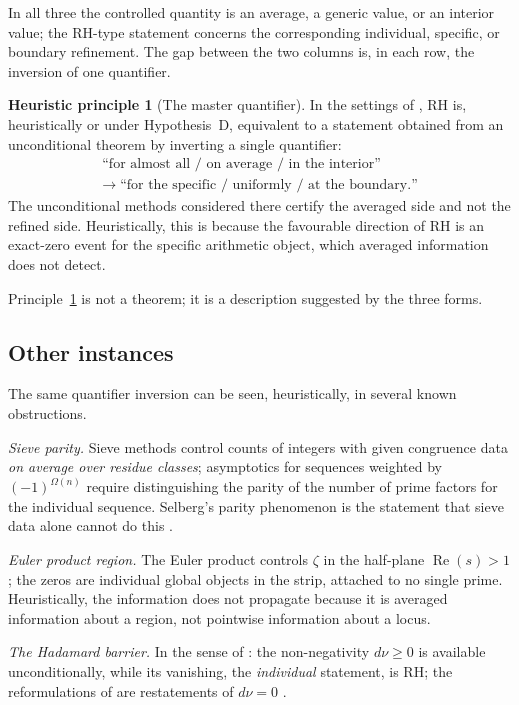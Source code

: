 \documentclass[11pt]{amsart}
\theoremstyle{definition}
\newtheorem{principle}[theorem]{Heuristic principle}
\theoremstyle{remark}
\newcommand{\dnu}{d\nu}
\DeclareMathOperator{\Real}{Re}
\begin{document}
In all three the controlled quantity is an average, a generic value, or an
interior value; the RH-type statement concerns the corresponding individual,
specific, or boundary refinement. The gap between the two columns is, in each
row, the inversion of one quantifier.

\begin{principle}[The master quantifier]\label{prin:master}
In the settings of \cite{P24,P27,P28}, RH is, heuristically or under Hypothesis~D, equivalent to a statement
obtained from an unconditional theorem by inverting a single quantifier:
\begin{gather*}
\text{``for almost all / on average / in the interior''}\\
\longrightarrow\;
\text{``for the specific / uniformly / at the boundary.''}
\end{gather*}
The unconditional methods considered there certify the averaged side and not
the refined side. Heuristically, this is because the favourable direction of
RH is an exact-zero event for the specific arithmetic object, which averaged
information does not detect.
\end{principle}

Principle~\ref{prin:master} is not a theorem; it is a description suggested
by the three forms.

\subsection{Other instances}
The same quantifier inversion can be seen, heuristically, in several known
obstructions.

\emph{Sieve parity.} Sieve methods control counts of integers with given
congruence data \emph{on average over residue classes}; asymptotics for
sequences weighted by $(-1)^{\Omega(n)}$ require distinguishing the parity of
the number of prime factors for the individual sequence. Selberg's parity
phenomenon is the statement that sieve data alone cannot do this
\cite{bgFI}.

\emph{Euler product region.} The Euler product controls $\zeta$ in the
half-plane $\Real(s)>1$; the zeros are individual global objects in the
strip, attached to no single prime. Heuristically, the information does not
propagate because it is averaged information about a region, not pointwise
information about a locus.

\emph{The Hadamard barrier.} In the sense of \cite[Def.~7.1]{P24}: the
non-negativity $\dnu\ge0$ is available unconditionally, while its vanishing,
the \emph{individual} statement, is RH; the reformulations of
\cite[Thm~4.1]{P24} are restatements of $\dnu=0$ \cite[Rem.~7.2]{P24}.
\end{document}
